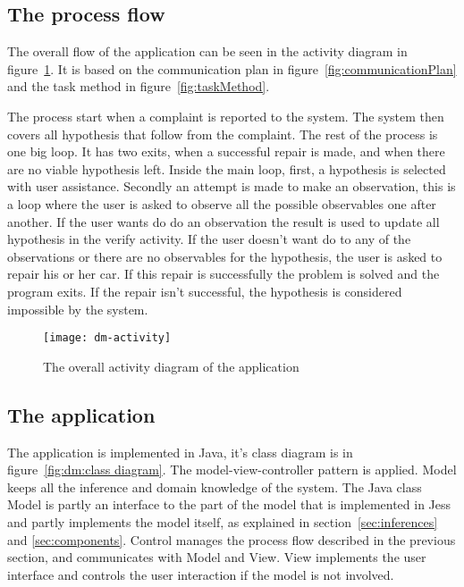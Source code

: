 \subsection{The process flow}
\label{sec:flow}

The overall flow of the application can be seen in the activity diagram in
figure~\ref{fig:dm:activity diagram}. It is based on the communication plan in figure~\ref{fig:communicationPlan}
and the task method in figure~\ref{fig:taskMethod}.

The process start when a complaint is reported to the system. The system then covers
all hypothesis that follow from the complaint. The rest of the process is one
big loop. It has two exits, when a successful repair is made, and when there are
no viable hypothesis left. Inside the main loop, first, a hypothesis is selected with
user assistance. Secondly an attempt is made to make an observation, this is a
loop where the user is asked to observe all the possible observables one after
another. If the user wants do do an observation the result is used to update all
hypothesis in the verify activity. If the user doesn't want do to any of the
observations or there are no observables for the hypothesis, the user is asked
to repair his or her car. If this repair is successfully the problem is solved and
the program exits. If the repair isn't successful, the hypothesis is considered
impossible by the system.

\begin{figure}[htbp]
    \centering
    \texttt{[image: dm-activity]}
    \caption{The overall activity diagram of the application}
    \label{fig:dm:activity diagram}
\end{figure}

\subsection{The application}
\label{sec:app}

The application is implemented in Java, it's class diagram is in figure~\ref{fig:dm:class diagram}.
The model-view-controller pattern is applied. Model keeps all the inference and
domain knowledge of the system. The Java class Model is partly an interface to the part of the model
that is implemented in Jess and partly implements the model
itself, as explained in section~\ref{sec:inferences} and \ref{sec:components}.
Control manages the process flow described in the previous section, and
communicates with Model and View. View implements the user interface and controls the user
interaction if the model is not involved.

